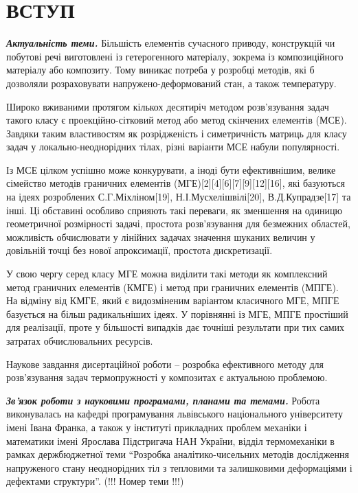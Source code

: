 \chapter{ВСТУП}

\emph{\textbf{Актуальність теми.}} Більшість елементів сучасного
приводу, конструкцій чи побутові речі виготовлені із гетерогенного
матеріалу, зокрема із композиційного матеріалу або композиту. Тому
виникає потреба у розробці методів, які б дозволяли розраховувати
напружено-деформований стан, а також температуру.

Широко вживаними протягом кількох десятиріч методом розв'язування задач
такого класу є проекційно-сітковий метод або метод скінчених елементів
(МСЕ). Завдяки таким властивостям як розрідженість і симетричність
матриць для класу задач у локально-неоднорідних тілах, різні варіанти
МСЕ набули популярності.

Із МСЕ цілком успішно може конкурувати, а іноді бути ефективнішим,
велике сімейство методів граничних елементів
(МГЕ){[}2{]}{[}4{]}{[}6{]}{[}7{]}{[}9{]}{[}12{]}{[}16{]}, які базуються
на ідеях розроблених С.Г.Міхліном{[}19{]}, Н.І.Мусхелішвілі{[}20{]},
В.Д.Купрадзе{[}17{]} та інші. Ці обставині особливо сприяють такі
переваги, як зменшення на одиницю геометричної розмірності задачі,
простота розв'язування для безмежних областей, можливість обчислювати у
лінійних задачах значення шуканих величин у довільній точці без нової
апроксимації, простота дискретизації.

У свою чергу серед класу МГЕ можна виділити такі методи як комплексний
метод граничних елементів (КМГЕ) і метод при граничних елементів (МПГЕ).
На відміну від КМГЕ, який є видозміненим варіантом класичного МГЕ, МПГЕ
базується на більш радикальніших ідеях. У порівнянні із МГЕ, МПГЕ
простіший для реалізації, проте у більшості випадків дає точніші
результати при тих самих затратах обчислювальних ресурсів.

Наукове завдання дисертаційної роботи -- розробка ефективного методу для
розв'язування задач термопружності у композитах є актуальною проблемою.

\emph{\textbf{Зв'язок роботи з науковими програмами, планами та
темами.}} Робота виконувалась на кафедрі програмування львівського
національного університету імені Івана Франка, а також у інституті
прикладних проблем механіки і математики імені Ярослава Підстригача НАН
України, відділ термомеханіки в рамках держбюджетної теми ``Розробка
аналітико-чисельних методів дослідження напруженого стану неоднорідних
тіл з тепловими та залишковими деформаціями і дефектами структури''.
(!!! Номер теми !!!)


